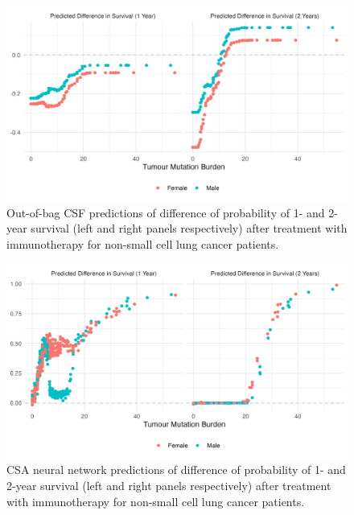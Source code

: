 \documentclass[../thesis.tex]{subfiles}
\begin{document}
\begin{figure}[!tpb] 
\centering
\includegraphics[width=\textwidth]{figures/chapter4/immuno_train_samples_hte_predictions.png} 

\caption{Out-of-bag CSF predictions of difference of probability of 1- and 2-year survival (left and right panels respectively) after treatment with immunotherapy for non-small cell lung cancer patients.  \label{fig:immuno_train_samples_hte_predictions}}
\end{figure}

\begin{figure}[!tpb] 
\centering
\includegraphics[width=\textwidth]{figures/chapter4/train_samples_nn_predictions.png} 

\caption{CSA neural network predictions of difference of probability of 1- and 2-year survival (left and right panels respectively) after treatment with immunotherapy for non-small cell lung cancer patients. \label{fig:immuno_train_samples_nn_hte_predictions}}
\end{figure}
\end{document}
